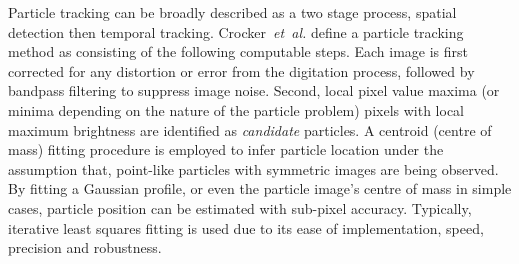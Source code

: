 Particle tracking can be broadly described as a two stage process, spatial detection then temporal tracking.
Crocker~\emph{et~al.} define a particle tracking method as consisting of the following computable steps.
Each image is first
corrected for any distortion or error from the digitation process, followed by bandpass filtering to suppress image noise. %
Second, local pixel value maxima (or minima depending on the nature of the particle problem) pixels with local maximum brightness are identified as \emph{candidate} particles.
A centroid (centre of mass) fitting procedure is employed to infer particle location under the assumption that, %
point-like particles with symmetric images are being observed.
By fitting a Gaussian profile, or even the particle image's centre of mass in simple cases, %
particle position can be estimated with sub-pixel accuracy.
Typically, iterative least squares fitting is used %
due to its ease of implementation, speed, precision and robustness.%
%
